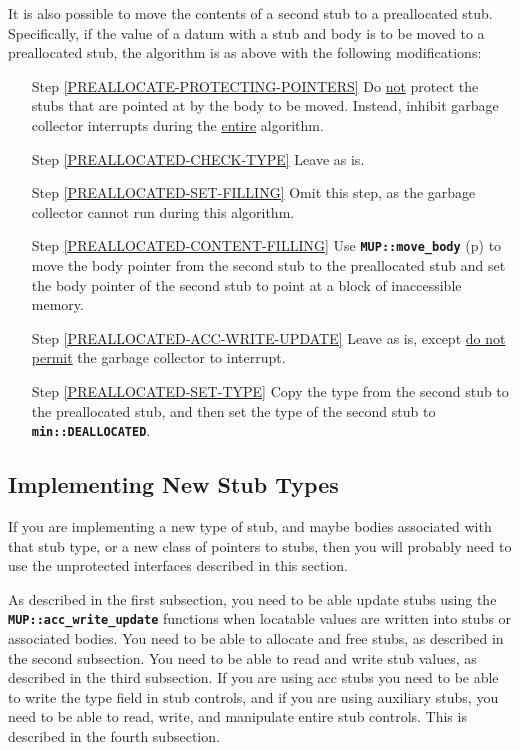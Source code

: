 \documentclass[12pt]{article}
\newcommand{\TT}[1]{{\tt \bfseries #1}}
\newcommand{\pagref}[1]{p\pageref{#1}}
\newcommand{\EOL}{\penalty \exhyphenpenalty}
\begin{document}
It is also possible to move the contents of a second stub to a
preallocated stub.  Specifically, if the value of a datum with
a stub and body is to be moved to a preallocated stub, the algorithm
is as above with the following modifications:

\begin{itemize}
\item[Step \ref{PREALLOCATE-PROTECTING-POINTERS}]
Do \underline{not} protect the stubs that are pointed
at by the body to be moved.  Instead, inhibit garbage collector
interrupts during the \underline{entire} algorithm.

\item[Step \ref{PREALLOCATED-CHECK-TYPE}] Leave as is.

\item[Step \ref{PREALLOCATED-SET-FILLING}] Omit this step, 
as the garbage collector cannot run during this algorithm.

\item[Step \ref{PREALLOCATED-CONTENT-FILLING}] Use
\TT{MUP::move\_\EOL body} (\pagref{MUP::MOVE_BODY}) to move the
body pointer from the second stub to the preallocated stub
and set the body pointer of the second stub to point at a block
of inaccessible memory.

\item[Step \ref{PREALLOCATED-ACC-WRITE-UPDATE}] Leave as is,
except \underline{do not permit} the garbage collector to interrupt.

\item[Step \ref{PREALLOCATED-SET-TYPE}] Copy the type from
the second stub to the preallocated stub, and then set the
type of the second stub to \TT{min::\EOL DEALLOCATED}.
\end{itemize}

\subsection{Implementing New Stub Types}
\label{IMPLEMENTING-NEW-STUB-TYPES}

If you are implementing a new type of stub, and maybe bodies
associated with that stub type, or a new class of pointers to stubs,
then you will probably need to use the unprotected
interfaces described in this section.

As described in the first subsection, you need to be able update stubs
using the \TT{MUP::\EOL acc\_\EOL write\_\EOL update} functions
when locatable values are written into stubs or associated bodies.
You need to be able to allocate and free stubs, as described in the
second subsection.  You need to be able to read and write stub values,
as described in the third subsection.  If you are using acc stubs you
need to be able to write the type field in stub controls, and if
you are using auxiliary stubs, you need to be able to read, write,
and manipulate entire stub controls.
This is described in the fourth subsection.
\end{document}
